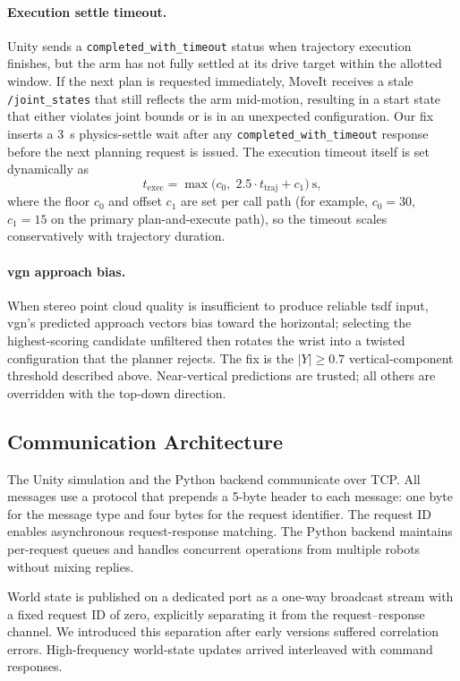 \paragraph{Execution settle timeout.}
Unity sends a \texttt{completed\_with\_timeout} status when trajectory execution finishes, but the arm has not fully settled at its drive target within the allotted window. If the next plan is requested immediately, MoveIt receives a stale \texttt{/joint\_states} that still reflects the arm mid-motion, resulting in a start state that either violates joint bounds or is in an unexpected configuration. Our fix inserts a 3~s physics-settle wait after any \texttt{completed\_with\_timeout} response before the next planning request is issued. The execution timeout itself is set dynamically as
\begin{equation}
	t_{\mathrm{exec}} = \max\bigl(c_0,\; 2.5 \cdot t_{\mathrm{traj}} + c_1\bigr)~\text{s},
\end{equation}
where the floor $c_0$ and offset $c_1$ are set per call path (for example, $c_0 = 30$, $c_1 = 15$ on the primary plan-and-execute path), so the timeout scales conservatively with trajectory duration.

\paragraph{\gls{vgn} approach bias.}
When stereo point cloud quality is insufficient to produce reliable \gls{tsdf} input, \gls{vgn}'s predicted approach vectors bias toward the horizontal; selecting the highest-scoring candidate unfiltered then rotates the wrist into a twisted configuration that the planner rejects. The fix is the $|Y| \geq 0.7$ vertical-component threshold described above. Near-vertical predictions are trusted; all others are overridden with the top-down direction.

\subsection{Communication Architecture}\label{sec:communication}
The Unity simulation and the Python backend communicate over TCP. All messages use a protocol that prepends a 5-byte header to each message: one byte for the message type and four bytes for the request identifier. The request ID enables asynchronous request-response matching. The Python backend maintains per-request queues and handles concurrent operations from multiple robots without mixing replies.

World state is published on a dedicated port as a one-way broadcast stream with a fixed request ID of zero, explicitly separating it from the request–response channel. We introduced this separation after early versions suffered correlation errors. High-frequency world-state updates arrived interleaved with command responses.

